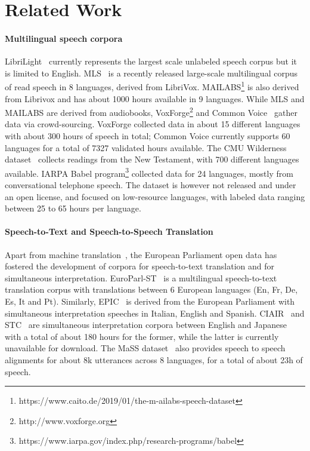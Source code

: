 \section{Related Work}

\paragraph{Multilingual speech corpora}
LibriLight~\citep{kahn2020libri} currently represents the largest scale unlabeled speech corpus but it is limited to English.
MLS~\cite{Pratap2020} is a recently released large-scale multilingual corpus of read speech in 8 languages, derived from LibriVox.
MAILABS\footnote{https://www.caito.de/2019/01/the-m-ailabs-speech-dataset} is also derived from Librivox and has about 1000 hours available in 9 languages.
While MLS and MAILABS are derived from audiobooks, VoxForge\footnote{http://www.voxforge.org} and Common Voice~\citep{ardila-etal-2020-common} gather data via crowd-sourcing. VoxForge collected data in about 15 different languages with about 300 hours of speech in total; Common Voice currently supports 60 languages for a total of 7327 validated hours available.
The CMU Wilderness dataset~\citep{black2019cmu} collects readings from the New Testament, with 700 different languages available.
IARPA Babel program\footnote{https://www.iarpa.gov/index.php/research-programs/babel} collected data for 24 languages, mostly
from conversational telephone speech. The dataset is however not released and under an open license, and focused on low-resource languages, with labeled data ranging between 25 to 65 hours per language.

\paragraph{Speech-to-Text and Speech-to-Speech Translation}

Apart from machine translation~\citep{koehn2005europarl}, the European Parliament open data has fostered the development of corpora for speech-to-text translation and for simultaneous interpretation. EuroParl-ST~\citep{iranzo2020europarl} is a multilingual speech-to-text translation corpus with translations between 6 European languages (En, Fr, De, Es, It and Pt). Similarly, EPIC~\citep{bendazzoli2005approach} is derived from the European Parliament with simultaneous interpretation speeches in Italian, English and Spanish. CIAIR~\citep{tohyama2004ciair} and STC~\citep{shimizu2014collection} are simultaneous interpretation corpora between English and Japanese with a total of about 180 hours for the former, while the latter is currently unavailable for download. The MaSS dataset~\citep{zanon-boito-etal-2020-mass} also provides speech to speech alignments for about 8k utterances across 8 languages, for a total of about 23h of speech.

